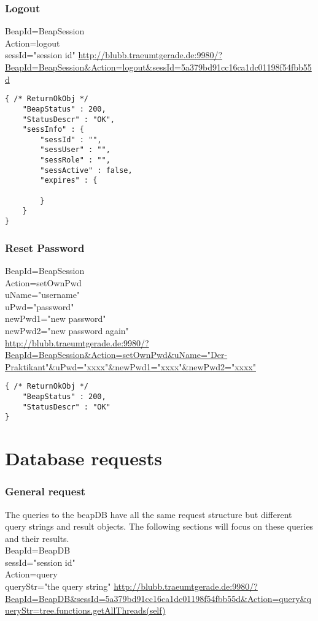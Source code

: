 \documentclass[12pt,a4paper,oneside]{report}
\begin{document}
\subsubsection{Logout}

BeapId=BeapSession\\
Action=logout\\
sessId="session id"
\url{http://blubb.traeumtgerade.de:9980/?BeapId=BeapSession&Action=logout&sessId=5a379bd91cc16ca1dc01198f54fbb55d}
\lstset{language=JavaScript}
\begin{lstlisting}
{ /* ReturnOkObj */
    "BeapStatus" : 200,
    "StatusDescr" : "OK",
    "sessInfo" : { 
        "sessId" : "",
        "sessUser" : "",
        "sessRole" : "",
        "sessActive" : false,
        "expires" : { 

        }
    }
}
\end{lstlisting}

\subsubsection{Reset Password}

BeapId=BeapSession\\
Action=setOwnPwd\\
uName="username"\\
uPwd="password"\\
newPwd1="new password"\\
newPwd2="new password again"\\
\url{http://blubb.traeumtgerade.de:9980/?BeapId=BeapSession&Action=setOwnPwd&uName="Der-Praktikant"&uPwd="xxxx"&newPwd1="xxxx"&newPwd2="xxxx"}
\lstset{language=JavaScript}
\begin{lstlisting}
{ /* ReturnOkObj */
    "BeapStatus" : 200,
    "StatusDescr" : "OK"
}
\end{lstlisting}

\section{Database requests}
\subsubsection{General request}
The queries to the beapDB have all the same request structure but different query strings and result objects. The following sections will focus on these queries and their results.
\\
BeapId=BeapDB\\
sessId="session id"\\
Action=query\\
queryStr="the query string"
\url{http://blubb.traeumtgerade.de:9980/?BeapId=BeapDB&sessId=5a379bd91cc16ca1dc01198f54fbb55d&Action=query&queryStr=tree.functions.getAllThreads(self)}
\end{document}
